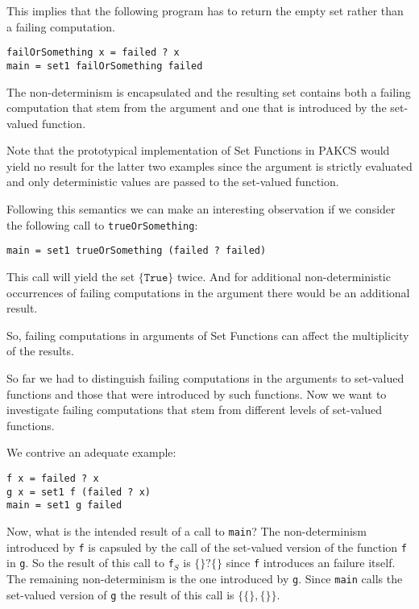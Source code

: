 \documentclass{article}
\begin{document}
This implies that the following program has to return the empty set rather than
a failing computation. 

\begin{lstlisting}
failOrSomething x = failed ? x
main = set1 failOrSomething failed
\end{lstlisting}

The non-determinism is encapsulated and the resulting set contains both a failing
computation that stem from the argument and one that is introduced by the set-valued
function. 

Note that the prototypical implementation of Set Functions in PAKCS would yield no 
result for the latter two examples since the argument is strictly evaluated and
only deterministic values are passed to the set-valued function.

Following this semantics we can make an interesting observation if we consider
the following call to \lstinline{trueOrSomething}:

\begin{lstlisting}
main = set1 trueOrSomething (failed ? failed)
\end{lstlisting}

This call will yield the set $\{\texttt{True}\}$ twice. And for additional
non-deterministic occurrences of failing computations in the argument there
would be an additional result. 

So, failing computations in arguments of Set Functions can affect the
multiplicity of the results.

So far we had to distinguish failing computations in the arguments to
set-valued functions and those that were introduced by such functions.
Now we want to investigate failing computations that stem from different
levels of set-valued functions. 

We contrive an adequate example:

\begin{lstlisting}
f x = failed ? x
g x = set1 f (failed ? x)
main = set1 g failed
\end{lstlisting}

Now, what is the intended result of a call to \lstinline{main}? The non-determinism
introduced by \lstinline{f} is capsuled by the call of the set-valued version of the
function \lstinline{f} in \lstinline{g}. So the result of this call to \lstinline{f}$_{S}$
is $\{\}?\{\}$ since \lstinline{f} introduces an failure itself. The remaining non-determinism
is the one introduced by \lstinline{g}. Since \lstinline{main} calls the set-valued version
of \lstinline{g} the result of this call is $\{\{\},\{\}\}$.
\end{document}
